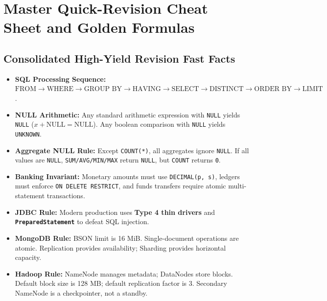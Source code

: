 \section{Master Quick-Revision Cheat Sheet and Golden Formulas}
\label{sec:dbms_quick_revision}

\subsection{Consolidated High-Yield Revision Fast Facts}
\begin{itemize}
    \item \textbf{SQL Processing Sequence:} $\text{FROM} \to \text{WHERE} \to \text{GROUP BY} \to \text{HAVING} \to \text{SELECT} \to \text{DISTINCT} \to \text{ORDER BY} \to \text{LIMIT}$.
    \item \textbf{NULL Arithmetic:} Any standard arithmetic expression with \texttt{NULL} yields \texttt{NULL} ($x + \text{NULL} = \text{NULL}$). Any boolean comparison with \texttt{NULL} yields \texttt{UNKNOWN}.
    \item \textbf{Aggregate NULL Rule:} Except \texttt{COUNT(*)}, all aggregates ignore \texttt{NULL}. If all values are \texttt{NULL}, \texttt{SUM/AVG/MIN/MAX} return \texttt{NULL}, but \texttt{COUNT} returns \texttt{0}.
    \item \textbf{Banking Invariant:} Monetary amounts must use \texttt{DECIMAL(p, s)}, ledgers must enforce \texttt{ON DELETE RESTRICT}, and funds transfers require atomic multi-statement transactions.
    \item \textbf{JDBC Rule:} Modern production uses \textbf{Type 4 thin drivers} and \textbf{\texttt{PreparedStatement}} to defeat SQL injection.
    \item \textbf{MongoDB Rule:} BSON limit is 16 MiB. Single-document operations are atomic. Replication provides availability; Sharding provides horizontal capacity.
    \item \textbf{Hadoop Rule:} NameNode manages metadata; DataNodes store blocks. Default block size is 128 MB; default replication factor is 3. Secondary NameNode is a checkpointer, not a standby.
\end{itemize}

